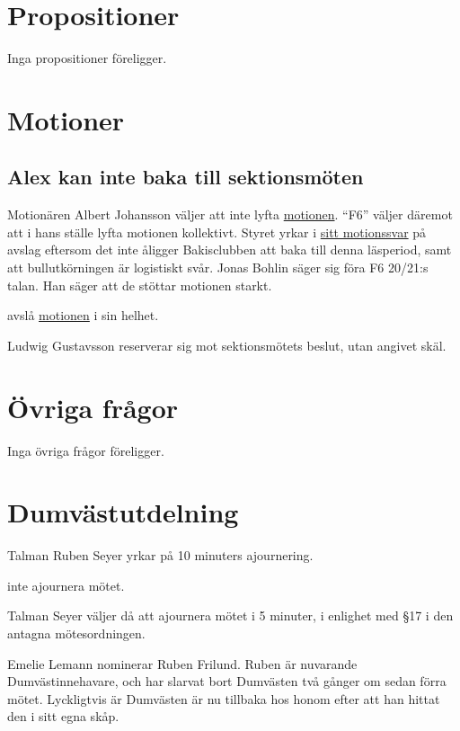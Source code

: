 \documentclass[hidelinks]{../sektionsmote} %
\begin{document}
\section{Propositioner}
Inga propositioner föreligger.

\section{Motioner}

\subsection{Alex kan inte baka till sektionsmöten}
Motionären Albert Johansson väljer att inte lyfta \hyperlink{bilagor/motion/a.pdf.1}{motionen}.
\enquote{F6} väljer däremot att i hans ställe lyfta motionen kollektivt.
Styret yrkar i \hyperlink{bilagor/motion/a-svar.pdf.1}{sitt motionssvar} på avslag eftersom det inte åligger Bakisclubben att baka till denna läsperiod, samt att bullutkörningen är logistiskt svår.
Jonas Bohlin säger sig föra F6 20/21:s talan.
Han säger att de stöttar motionen starkt.
\begin{beslut}
    \item avslå \hyperlink{bilagor/motion/a.pdf.1}{motionen} i sin helhet.
\end{beslut}
Ludwig Gustavsson reserverar sig mot sektionsmötets beslut, utan angivet skäl.

\section{Övriga frågor}
Inga övriga frågor föreligger.

\section{Dumvästutdelning}
\begin{ofraga}
    Talman Ruben Seyer yrkar på 10 minuters ajournering.
    \begin{beslut}
        \item inte ajournera mötet.
    \end{beslut}
    Talman Seyer väljer då att ajournera mötet i 5 minuter, i enlighet med §17 i den antagna mötesordningen.
\end{ofraga}

Emelie Lemann nominerar Ruben Frilund.
Ruben är nuvarande Dumvästinnehavare, och har slarvat bort Dumvästen två gånger om sedan förra mötet.
Lyckligtvis är Dumvästen är nu tillbaka hos honom efter att han hittat den i sitt egna skåp.
\end{document}
